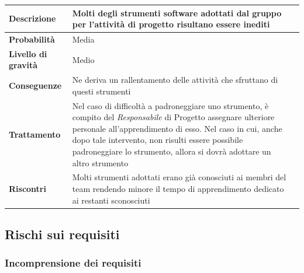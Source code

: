 \begin{center}
	
	\begin{tabular}{|>{\centering}m{4cm} ||>{\centering}m{8cm} |>{\centering\arraybackslash}m{0pt}@{}|}
		\hline
		\textbf{Descrizione} & Molti degli strumenti software adottati dal gruppo per l’attività di progetto risultano essere inediti & \\[2ex]
		\hline	
		\textbf{Probabilità} & Media & \\[1ex]
		\hline
		\textbf{Livello di gravità} & Medio & \\[1ex]
		\hline
		\textbf{Conseguenze} & Ne deriva un rallentamento delle attività
		che sfruttano di questi strumenti & \\[1ex]
		\hline
		\textbf{Trattamento} & Nel caso di difficoltà a padroneggiare uno
		strumento, è compito del  \emph{Responsabile}  di Progetto assegnare
		ulteriore personale all’apprendimento di esso. Nel caso in cui,
		anche dopo tale intervento, non risulti essere possibile
		padroneggiare lo strumento, allora si dovrà adottare un altro
		strumento & \\[1ex] 
		\hline
		\textbf{Riscontri} & Molti strumenti adottati erano già conosciuti ai membri del team rendendo minore il tempo di apprendimento dedicato ai restanti sconosciuti & \\[1ex]
		\hline
	\end{tabular}
	
\end{center}

\subsection{Rischi sui requisiti}
\subsubsection{Incomprensione dei requisiti}

